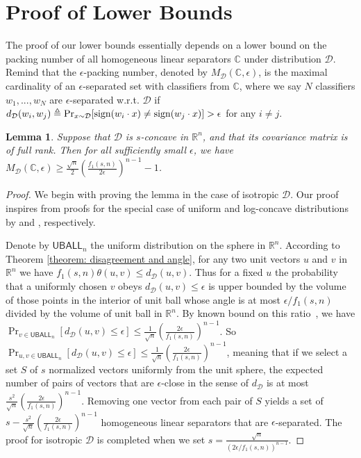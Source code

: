 \documentclass[11pt]{article}
\newcommand{\cD}{\mathcal{D}}
\newcommand{\R}{\mathbb{R}}
\newcommand{\sign}{\textup{sign}}
\newtheorem{lemma}[theorem]{Lemma}
\begin{document}
{{{{\section{Proof of Lower Bounds}
\label{section: proof of lower bounds}
The proof of our lower bounds essentially depends on a lower bound on the packing number of all homogeneous linear separators $\mathbb{C}$ under distribution $\cD$. Remind that the $\epsilon$-packing number, denoted by $M_\cD(\mathbb{C},\epsilon)$, is the maximal cardinality of an $\epsilon$-separated set with classifiers from $\mathbb{C}$, where we say $N$ classifiers $w_1,...,w_N$ are $\epsilon$-separated w.r.t. $\cD$ if $d_\cD(w_i,w_j)\triangleq\Pr_{x\sim\cD}[\sign(w_i\cdot x)\not=\sign(w_j\cdot x)]>\epsilon$ for any $i\not=j$.

\begin{lemma}
\label{lemma: packing number}
Suppose that $\cD$ is $s$-concave in $\R^n$, and that its covariance matrix is of full rank. Then for all sufficiently small $\epsilon$, we have $M_\cD(\mathbb{C},\epsilon)\ge \frac{\sqrt{n}}{2}\left(\frac{f_1(s,n)}{2\epsilon}\right)^{n-1}-1$.
\end{lemma}

\begin{proof}
We begin with proving the lemma in the case of isotropic $\cD$. Our proof inspires from proofs for the special case of uniform and log-concave distributions by \cite{long1995sample} and \cite{balcan2013active}, respectively.

Denote by $\textsf{UBALL}_n$ the uniform distribution on the sphere in $\R^n$. According to Theorem \ref{theorem: disagreement and angle}, for any two unit vectors $u$ and $v$ in $\R^n$ we have $f_1(s,n)\theta(u,v)\le d_\cD(u,v)$. Thus for a fixed $u$ the probability that a uniformly chosen $v$ obeys $d_\cD(u,v)\le\epsilon$ is upper bounded by the volume of those points in the interior of unit ball whose angle is at most $\epsilon/f_1(s,n)$ divided by the volume of unit ball in $\R^n$. By known bound on this ratio~\cite{long1995sample}, we have $\Pr_{v\in\textsf{UBALL}_n}[d_\cD(u,v)\le\epsilon]\le \frac{1}{\sqrt{n}}\left(\frac{2\epsilon}{f_1(s,n)}\right)^{n-1}$. So $\Pr_{u,v\in\textsf{UBALL}_n}[d_\cD(u,v)\le\epsilon]\le \frac{1}{\sqrt{n}}\left(\frac{2\epsilon}{f_1(s,n)}\right)^{n-1}$, meaning that if we select a set $S$ of $s$ normalized vectors uniformly from the unit sphere, the expected number of pairs of vectors that are $\epsilon$-close in the sense of $d_\cD$ is at most $\frac{s^2}{\sqrt{n}}\left(\frac{2\epsilon}{f_1(s,n)}\right)^{n-1}$. Removing one vector from each pair of $S$ yields a set of $s-\frac{s^2}{\sqrt{n}}\left(\frac{2\epsilon}{f_1(s,n)}\right)^{n-1}$ homogeneous linear separators that are $\epsilon$-separated. The proof for isotropic $\cD$ is completed when we set $s=\frac{\sqrt{n}}{(2\epsilon/f_1(s,n))^{n-1}}$.


\end{proof}}}}}
\end{document}
